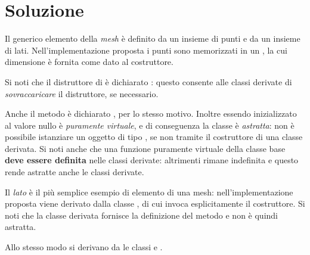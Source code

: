 \newpage

\section*{Soluzione}

Il generico elemento
della \emph{mesh} \`e definito  da un insieme di punti e da un insieme
di lati. Nell'implementazione proposta i punti sono memorizzati in un
, la cui dimensione \`e fornita come dato al costruttore.

\lstset{basicstyle=\scriptsize\sf}


\lstset{basicstyle=\sf}

Si noti che il distruttore di  \`e dichiarato
: questo consente alle classi derivate di 
\emph{sovraccaricare} il distruttore, se necessario.

Anche il metodo
 \`e dichiarato , per lo stesso
motivo. Inoltre essendo inizializzato al valore nullo \`e
\emph{puramente virtuale}, e di conseguenza la classe  \`e
\emph{astratta}: non \`e possibile
istanziare un oggetto di tipo , se non tramite il
costruttore di una classe derivata. Si noti anche che una funzione
puramente virtuale della classe base \textbf{deve essere definita}
nelle classi derivate: altrimenti rimane indefinita e questo rende
astratte anche le classi derivate.

Il \emph{lato} \`e il pi\`u semplice esempio di elemento di una mesh:
nell'implementazione proposta viene derivato dalla classe ,
di cui invoca esplicitamente il costruttore. Si noti che la classe
derivata  fornisce la definizione del metodo 
e non \`e quindi astratta.

\lstset{basicstyle=\scriptsize\sf}

\lstset{basicstyle=\sf}

Allo stesso modo si derivano da  le classi  e .

\lstset{basicstyle=\scriptsize\sf}



